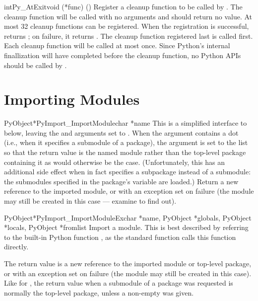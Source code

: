 \documentclass{manual}
\begin{document}
\begin{cfuncdesc}{int}{Py_AtExit}{void (*func) ()}
Register a cleanup function to be called by .
The cleanup function will be called with no arguments and should
return no value.  At most 32 cleanup functions can be registered.
When the registration is successful,  returns
; on failure, it returns .  The cleanup function
registered last is called first.  Each cleanup function will be called
at most once.  Since Python's internal finallization will have
completed before the cleanup function, no Python APIs should be called
by .
\end{cfuncdesc}


\section{Importing Modules \label{importing}}

\begin{cfuncdesc}{PyObject*}{PyImport_ImportModule}{char *name}
This is a simplified interface to 
below, leaving the  and  arguments set to
\NULL{}.  When the  argument contains a dot (i.e., when
it specifies a submodule of a package), the  argument is
set to the list \code{['*']} so that the return value is the named
module rather than the top-level package containing it as would
otherwise be the case.  (Unfortunately, this has an additional side
effect when  in fact specifies a subpackage instead of a
submodule: the submodules specified in the package's 
variable are loaded.)  Return a new reference to the imported module,
or \NULL{} with an exception set on failure (the module may still
be created in this case --- examine  to find out).
\end{cfuncdesc}

\begin{cfuncdesc}{PyObject*}{PyImport_ImportModuleEx}{char *name, PyObject *globals, PyObject *locals, PyObject *fromlist}
Import a module.  This is best described by referring to the built-in
Python function , as
the standard  function calls this function
directly.

The return value is a new reference to the imported module or
top-level package, or \NULL{} with an exception set on failure
(the module may still be created in this case).  Like for
, the return value when a submodule of a
package was requested is normally the top-level package, unless a
non-empty  was given.
\end{cfuncdesc}
\end{document}
